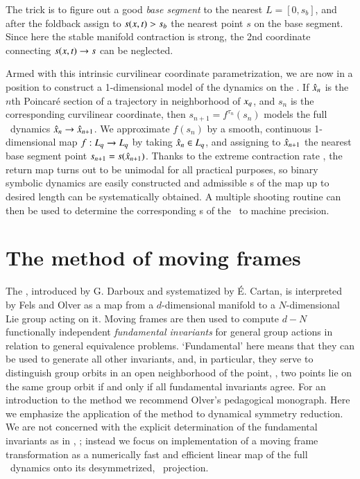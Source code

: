 \documentclass[final,number,sort&compress]{elsarticle}
\begin{document}
The trick is to figure out a good {\em base segment} to the
nearest {\turn} $L=[0,s_{b}]$, and after the foldback assign
to $s(x,t)>s_{b}$ the nearest point $s$ on the base
segment. Since here the stable manifold contraction is strong, the
2nd coordinate connecting $s(x,t) \to s$ can be neglected.

Armed with this intrinsic curvilinear coordinate
parametrization, we are now in a position to construct a
1-dimensional model of the dynamics on the \nws. If
$\hat{x}_n$ is the $n$th Poincar\'e section of a
trajectory in neighborhood of $x_q$, and $s_n$ is the
corresponding curvilinear coordinate, then $s_{n+1} =
f^{\tau_n}(s_n)$ models the full \statesp\ dynamics
$\hat{x}_n \to \hat{x}_{n+1}$. We approximate $f(s_n)$
by a smooth, continuous 1-dimensional map $f : L_q \to
L_q$ by taking $\hat{x}_n \in L_q$, and
assigning to $\hat{x}_{n+1}$ the nearest base segment
point $s_{n+1}=s(\hat{x}_{n+1})$. Thanks to the extreme
contraction rate , the return map turns out to
be unimodal for all practical purposes, so binary symbolic dynamics are easily
constructed and admissible \po s of the map up to desired length can be
systematically obtained. A multiple shooting routine can then be
used to determine the corresponding \rpo s
of the \cLe\ to machine precision.


\section{\label{sec:mf} The method of moving frames} 

The \mframes, introduced by G. Darboux and systematized by
\'E. Cartan, is interpreted by Fels and
Olver as a map from a
$d$-dimensional manifold
to a $N$-dimensional Lie group acting on it.
Moving frames are then used to
compute $d-N$ functionally independent \emph{fundamental
in\-vari\-ants} for general group actions in relation to general
equivalence problems. `Fundamental' here means that they can
be used to generate all other in\-vari\-ants, and, in particular,
they serve to distinguish group orbits in an open
neighborhood of the {\slice} point, \ie, two points lie on
the same group orbit if and only if all fundamental
in\-vari\-ants agree. For an introduction to the method we
recommend Olver's pedagogical monograph. Here we
emphasize the application of the method to dynamical symmetry
reduction. We are not
concerned with the explicit
determination of the fundamental in\-vari\-ants as in
, ; instead we focus on
implementation of a moving frame transformation as a
numerically fast and efficient linear map of the full
\statesp\ dynamics onto its desymmetrized, \reducedsp\
projection.
\end{document}
